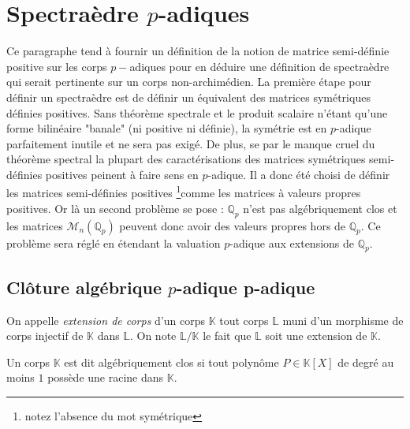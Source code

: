 \newcommand\mat{matrice semi-définie positive } 
\newcommand\Mat{Matrice semi-définie positive }
\newcommand\mats{matrices semi-définies positives }
\newcommand\Mats{Matrices semi-définies positives }


\section{Spectraèdre \texorpdfstring{$p$}{p}-adiques } 
Ce paragraphe tend à fournir un définition de la notion de \mat sur les corps $p-$adiques pour en déduire une définition de spectraèdre qui serait pertinente sur un corps non-archimédien. 
La première étape pour définir un spectraèdre est de définir un équivalent des matrices symétriques définies positives. Sans théorème spectrale et le produit scalaire n'étant qu'une forme bilinéaire "banale" (ni positive ni définie), la symétrie est en $p$-adique parfaitement inutile et ne sera pas exigé. De plus, se par le manque cruel du théorème spectral la plupart des caractérisations des matrices symétriques semi-définies positives peinent à faire sens en $p$-adique. 
Il a donc été choisi de définir les \mats \footnote{notez l'absence du mot symétrique}comme les matrices à valeurs propres positives.
Or là un second problème se pose : $\mathbb{Q}_{p} $ n'est pas algébriquement clos et les matrices $\mathcal{M}_n\left( \mathbb{Q}_{p}  \right) $ peuvent donc avoir des valeurs propres hors de $\mathbb{Q}_{p}$. Ce problème sera réglé en étendant la valuation $p$-adique aux extensions de $\mathbb{Q}_{p} $.

\subsection{Clôture algébrique $p$-adique \texorpdfstring{p}{$p$}-adique } 

\begin{definition}
	On appelle \textit{extension de corps} d'un corps $\mathbb{K}$ tout corps $\mathbb{L}$ muni d'un morphisme de corps injectif de $\mathbb{K}$ dans $\mathbb{L}$. On note $\mathbb{L}/\mathbb{K}$ le fait que $\mathbb{L}$ soit une extension de $\mathbb{K}.$
\end{definition}


\begin{definition}
	Un corps $\mathbb{K}$ est dit algébriquement clos si tout polynôme $P\in \mathbb{K}[X]$ de degré au moins $1$ possède une racine dans $\mathbb{K}$.
\end{definition}

